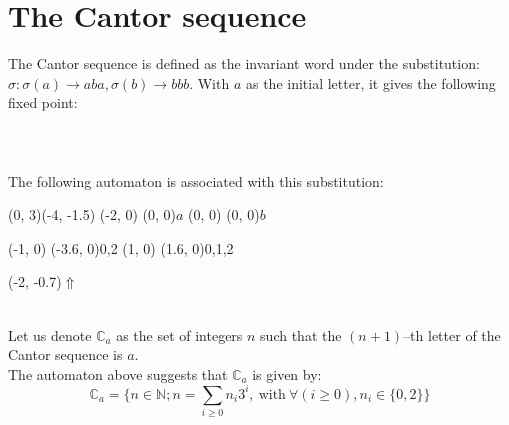 \documentclass{article}
\begin{document}
\section*{The Cantor sequence}
The Cantor sequence is defined as the invariant word under the substitution: 
$\sigma: \sigma(a) \rightarrow aba, \sigma(b) \rightarrow bbb$. With $a$ as the
initial letter, it gives the following fixed point:\\
\\
\\
\\
The following automaton is associated with this
substitution:\\
\begin{graph}(0, 3)(-4, -1.5)
  (-2, 0) (0, 0){$a$}
  (0, 0)  (0, 0){$b$}

  (-1, 0) \freetext(-3.6, 0){0,2}
   
  (1, 0) \freetext(1.6, 0){0,1,2}

  \freetext(-2, -0.7){$\Uparrow$}
\end{graph}\\
Let us denote $\mathbb{C}_a$ as the set of integers $n$ such that the
$(n + 1)$--th letter of the Cantor sequence is $a$.\\
The automaton above suggests that $\mathbb{C}_a$ is given by:
\begin{displaymath}
  \mathbb{C}_a = \Big\{n \in \mathbb{N}; n = \sum_{i \ge 0} n_i3^i,
  \mathrm{\ with\ } \forall(i \ge 0), n_i \in \{0, 2\}\Big\}
\end{displaymath}
\end{document}
